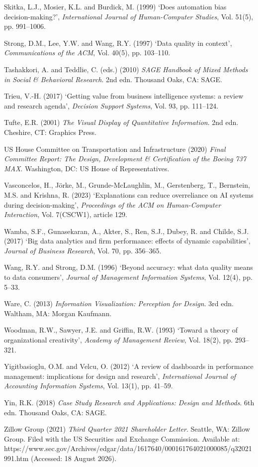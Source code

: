 \documentclass[12pt,a4paper]{article}
\begin{document}
{\rf Skitka, L.J., Mosier, K.L. and Burdick, M. (1999) `Does automation bias decision-making?', \emph{International Journal of Human-Computer Studies}, Vol. 51(5), pp. 991--1006.

\rf Strong, D.M., Lee, Y.W. and Wang, R.Y. (1997) `Data quality in context', \emph{Communications of the ACM}, Vol. 40(5), pp. 103--110.

\rf Tashakkori, A. and Teddlie, C. (eds.) (2010) \emph{SAGE Handbook of Mixed Methods in Social \& Behavioral Research}. 2nd edn. Thousand Oaks, CA: SAGE.

\rf Trieu, V.-H. (2017) `Getting value from business intelligence systems: a review and research agenda', \emph{Decision Support Systems}, Vol. 93, pp. 111--124.

\rf Tufte, E.R. (2001) \emph{The Visual Display of Quantitative Information}. 2nd edn. Cheshire, CT: Graphics Press.

\rf US House Committee on Transportation and Infrastructure (2020) \emph{Final Committee Report: The Design, Development \& Certification of the Boeing 737 MAX}. Washington, DC: US House of Representatives.

\rf Vasconcelos, H., Jörke, M., Grunde-McLaughlin, M., Gerstenberg, T., Bernstein, M.S. and Krishna, R. (2023) `Explanations can reduce overreliance on AI systems during decision-making', \emph{Proceedings of the ACM on Human-Computer Interaction}, Vol. 7(CSCW1), article 129.

\rf Wamba, S.F., Gunasekaran, A., Akter, S., Ren, S.J., Dubey, R. and Childe, S.J. (2017) `Big data analytics and firm performance: effects of dynamic capabilities', \emph{Journal of Business Research}, Vol. 70, pp. 356--365.

\rf Wang, R.Y. and Strong, D.M. (1996) `Beyond accuracy: what data quality means to data consumers', \emph{Journal of Management Information Systems}, Vol. 12(4), pp. 5--33.

\rf Ware, C. (2013) \emph{Information Visualization: Perception for Design}. 3rd edn. Waltham, MA: Morgan Kaufmann.

\rf Woodman, R.W., Sawyer, J.E. and Griffin, R.W. (1993) `Toward a theory of organizational creativity', \emph{Academy of Management Review}, Vol. 18(2), pp. 293--321.

\rf Yigitbasioglu, O.M. and Velcu, O. (2012) `A review of dashboards in performance management: implications for design and research', \emph{International Journal of Accounting Information Systems}, Vol. 13(1), pp. 41--59.

\rf Yin, R.K. (2018) \emph{Case Study Research and Applications: Design and Methods}. 6th edn. Thousand Oaks, CA: SAGE.

\rf Zillow Group (2021) \emph{Third Quarter 2021 Shareholder Letter}. Seattle, WA: Zillow Group. Filed with the US Securities and Exchange Commission. Available at: https://www.sec.gov/Archives/edgar/data/1617640/000161764021000085/q32021991.htm (Accessed: 18 August 2026).
\par}
\end{document}
